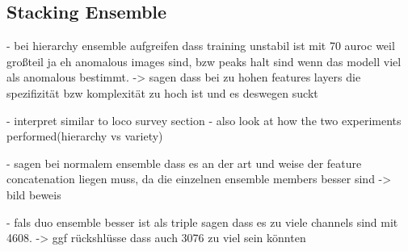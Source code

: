 \subsection{Stacking Ensemble}
\label{subsec:stackingdiscussion}


- bei hierarchy ensemble aufgreifen dass training unstabil ist mit 70 auroc weil großteil ja eh anomalous images sind, bzw peaks halt sind wenn das modell viel als anomalous bestimmt.
-> sagen dass bei zu hohen features layers die spezifizität bzw komplexität zu hoch ist und es deswegen suckt

- interpret similar to loco survey section\newline
- also look at how the two experiments performed(hierarchy vs variety)\newline


- sagen bei normalem ensemble dass es an der art und weise der feature concatenation liegen muss, da die einzelnen ensemble members besser sind
-> bild beweis

- fals duo ensemble besser ist als triple sagen dass es zu viele channels sind mit 4608. -> ggf rückshlüsse dass auch 3076 zu viel sein könnten

